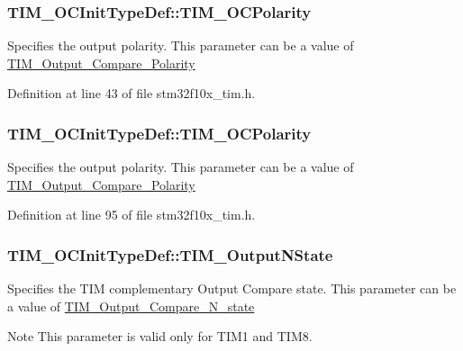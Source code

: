 \subsubsection[{\texorpdfstring{T\+I\+M\+\_\+\+O\+C\+Polarity}{TIM_OCPolarity}}]{ T\+I\+M\+\_\+\+O\+C\+Init\+Type\+Def\+::\+T\+I\+M\+\_\+\+O\+C\+Polarity}\hypertarget{struct_t_i_m___o_c_init_type_def_aae7d72f8eb93085bb976167d30b138ff}{}\label{struct_t_i_m___o_c_init_type_def_aae7d72f8eb93085bb976167d30b138ff}
Specifies the output polarity. This parameter can be a value of \hyperlink{group___t_i_m___output___compare___polarity}{T\+I\+M\+\_\+\+Output\+\_\+\+Compare\+\_\+\+Polarity} 

Definition at line 43 of file stm32f10x\+\_\+tim.\+h.

\subsubsection[{\texorpdfstring{T\+I\+M\+\_\+\+O\+C\+Polarity}{TIM_OCPolarity}}]{ T\+I\+M\+\_\+\+O\+C\+Init\+Type\+Def\+::\+T\+I\+M\+\_\+\+O\+C\+Polarity}\hypertarget{struct_t_i_m___o_c_init_type_def_a9ed3e2de4700d008729a916d8ba78486}{}\label{struct_t_i_m___o_c_init_type_def_a9ed3e2de4700d008729a916d8ba78486}
Specifies the output polarity. This parameter can be a value of \hyperlink{group___t_i_m___output___compare___polarity}{T\+I\+M\+\_\+\+Output\+\_\+\+Compare\+\_\+\+Polarity} 

Definition at line 95 of file stm32f10x\+\_\+tim.\+h.

\subsubsection[{\texorpdfstring{T\+I\+M\+\_\+\+Output\+N\+State}{TIM_OutputNState}}]{ T\+I\+M\+\_\+\+O\+C\+Init\+Type\+Def\+::\+T\+I\+M\+\_\+\+Output\+N\+State}\hypertarget{struct_t_i_m___o_c_init_type_def_ae33a1ca0397eb06cbb51c32264cdea13}{}\label{struct_t_i_m___o_c_init_type_def_ae33a1ca0397eb06cbb51c32264cdea13}
Specifies the T\+IM complementary Output Compare state. This parameter can be a value of \hyperlink{group___t_i_m___output___compare___n__state}{T\+I\+M\+\_\+\+Output\+\_\+\+Compare\+\_\+\+N\+\_\+state} \begin{DoxyNote}{Note}
This parameter is valid only for T\+I\+M1 and T\+I\+M8. 
\end{DoxyNote}


